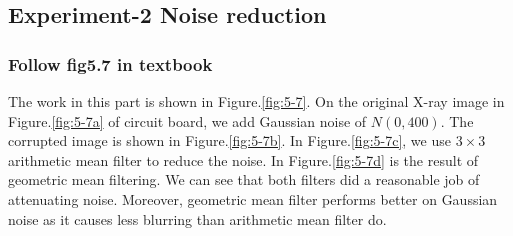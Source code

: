 \subsection{Experiment-2 Noise reduction}
\subsubsection{Follow fig5.7 in textbook}
The work in this part is shown in Figure.\ref{fig:5-7}. On the original X-ray image in Figure.\ref{fig:5-7a} of circuit board, we add Gaussian noise of $N(0,400)$. The corrupted image is shown in Figure.\ref{fig:5-7b}. In Figure.\ref{fig:5-7c}, we use $3\times3$ arithmetic mean filter to reduce the noise. In Figure.\ref{fig:5-7d} is the result of geometric mean filtering. We can see that both filters did a reasonable job of attenuating noise. Moreover, geometric mean filter performs better on Gaussian noise as it causes less blurring than arithmetic mean filter do.
